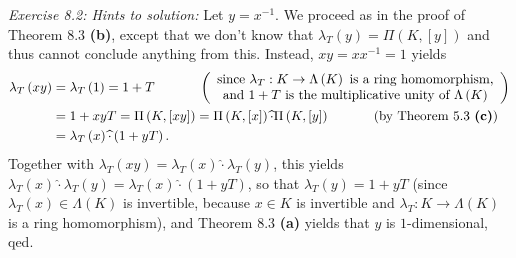 \documentclass[numbers=enddot,12pt,final,onecolumn,notitlepage]{scrartcl}%
\begin{document}
\textit{Exercise 8.2: Hints to solution:} Let $y=x^{-1}$. We proceed as in the
proof of Theorem 8.3 \textbf{(b)}, except that we don't know that $\lambda
_{T}\left(  y\right)  =\Pi\left(  K,\left[  y\right]  \right)  $ and thus
cannot conclude anything from this. Instead, $xy=xx^{-1}=1$ yields%
\begin{align*}
\lambda_{T}\left(  xy\right)   &  =\lambda_{T}\left(  1\right)
=1+T\ \ \ \ \ \ \ \ \ \ \left(
\begin{array}
[c]{c}%
\text{since }\lambda_{T}:K\rightarrow\Lambda\left(  K\right)  \text{ is a ring
homomorphism,}\\
\text{and }1+T\text{ is the multiplicative unity of }\Lambda\left(  K\right)
\end{array}
\right) \\
&  =1+xyT=\Pi\left(  K,\left[  xy\right]  \right)  =\Pi\left(  K,\left[
x\right]  \right)  \widehat{\cdot}\Pi\left(  K,\left[  y\right]  \right)
\ \ \ \ \ \ \ \ \ \ \left(  \text{by Theorem 5.3 \textbf{(c)}}\right) \\
&  =\lambda_{T}\left(  x\right)  \widehat{\cdot}\left(  1+yT\right)  .
\end{align*}
Together with $\lambda_{T}\left(  xy\right)  =\lambda_{T}\left(  x\right)
\widehat{\cdot}\lambda_{T}\left(  y\right)  $, this yields $\lambda_{T}\left(
x\right)  \widehat{\cdot}\lambda_{T}\left(  y\right)  =\lambda_{T}\left(
x\right)  \widehat{\cdot}\left(  1+yT\right)  $, so that $\lambda_{T}\left(
y\right)  =1+yT$ (since $\lambda_{T}\left(  x\right)  \in\Lambda\left(
K\right)  $ is invertible, because $x\in K$ is invertible and $\lambda
_{T}:K\rightarrow\Lambda\left(  K\right)  $ is a ring homomorphism), and
Theorem 8.3 \textbf{(a)} yields that $y$ is $1$-dimensional, qed.
\end{document}
